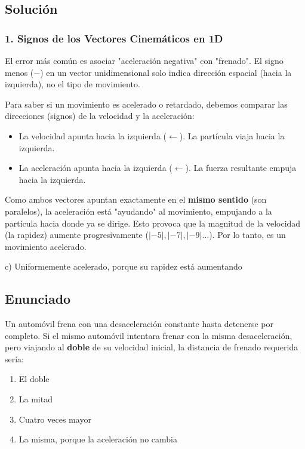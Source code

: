 \documentclass[12pt, a4paper]{article}
\begin{document}
\subsection*{Solución}

\subsubsection*{1. Signos de los Vectores Cinemáticos en 1D}
El error más común es asociar "aceleración negativa" con "frenado". El signo menos ($-$) en un vector unidimensional solo indica dirección espacial (hacia la izquierda), no el tipo de movimiento.

Para saber si un movimiento es acelerado o retardado, debemos comparar las direcciones (signos) de la velocidad y la aceleración:
\begin{itemize}
    \item La velocidad apunta hacia la izquierda ($\leftarrow$). La partícula viaja hacia la izquierda.
    \item La aceleración apunta hacia la izquierda ($\leftarrow$). La fuerza resultante empuja hacia la izquierda.
\end{itemize}
Como ambos vectores apuntan exactamente en el \textbf{mismo sentido} (son paralelos), la aceleración está "ayudando" al movimiento, empujando a la partícula hacia donde ya se dirige. Esto provoca que la magnitud de la velocidad (la rapidez) aumente progresivamente ($|-5|, |-7|, |-9|\dots$). Por lo tanto, es un movimiento acelerado.

\begin{tcolorbox}[colback=green!5!white, colframe=green!50!black, title=Respuesta Final]
\centering \Large c) Uniformemente acelerado, porque su rapidez está aumentando
\end{tcolorbox}

\newpage

\subsection*{Enunciado}
Un automóvil frena con una desaceleración constante hasta detenerse por completo. Si el mismo automóvil intentara frenar con la misma desaceleración, pero viajando al \textbf{doble} de su velocidad inicial, la distancia de frenado requerida sería:
\begin{enumerate}[label=\alph*)]
    \item El doble
    \item La mitad
    \item Cuatro veces mayor
    \item La misma, porque la aceleración no cambia
\end{enumerate}
\end{document}
